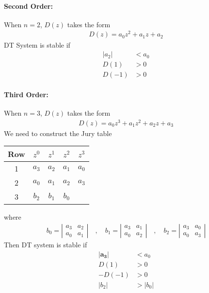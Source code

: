 \documentclass[twoside]{article}
\begin{document}
\paragraph{Second Order:} When $n=2$, $D(z)$ takes the form
%
\begin{align*}
  D(z) = a_0 z^2 + a_1 z + a_2
\end{align*}
%
DT System is stable if
%
\begin{align*}
  |a_2| &< a_0 
\\
D(1) &> 0
\\
D(-1) &> 0
\end{align*}
%
\paragraph{Third Order:} When $n=3$, $D(z)$ takes the form
%
\begin{align*}
  D(z) = a_0 z^3 + a_1 z^2 + a_2 z + a_3
\end{align*}
%
We need to construct the Jury table 
%
\begin{center}
  \begin{tabular}{ | c || c  c  c c |}
    \hline
    Row & $z^0$ & $z^1$ & $z^2$ & $z^3$ \\ \hline \hline
    1 & $a_3$ & $a_2$ & $a_1$ & $a_0$ \\ \hline
    2 & $a_0$ & $a_1$ & $a_2$ & $a_3$ \\ \hline
    3 & $b_2$ & $b_1$ & $b_0$ &  \\\hline
  \end{tabular}
\end{center}
%
where
%
\begin{align*}
  b_{0} = \left| \begin{array}{cc} a_3 & a_2 \\ a_0 & a_1 \end{array}
                                                      \right|
\quad , \quad 
  b_{1} = \left| \begin{array}{cc} a_3 & a_1 \\ a_0 & a_2 \end{array}
                                                      \right|
\quad , \quad 
  b_{2} = \left| \begin{array}{cc} a_3 & a_0 \\ a_0 & a_3 \end{array}
                                                      \right|
\end{align*}
%
Then DT system is stable if
%
\begin{align*}
  \mathbf{|a_3|} &< a_0 
\\
D(1) &> 0
\\
\pmb{-} D(-1) &> 0
\\
|b_2| &> |b_0|
\end{align*}
%
\end{document}
